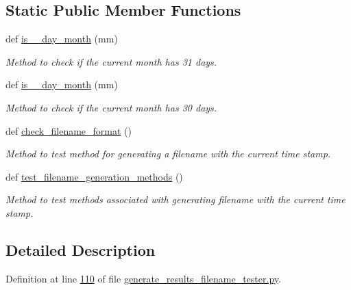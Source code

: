 \subsection*{Static Public Member Functions}
\begin{DoxyCompactItemize}
\item 
def \hyperlink{classutilities_1_1generate__results__filename__tester_1_1generate__filename__tester_a2f7f8ef1861b75a2b2a0ffe583bcdc81}{is\+\_\+\_\+day\+\_\+month} (mm)
\begin{DoxyCompactList}\small\item\em Method to check if the current month has 31 days. \end{DoxyCompactList}\item 
def \hyperlink{classutilities_1_1generate__results__filename__tester_1_1generate__filename__tester_a7aae79997134dc7250949e725d92aedf}{is\+\_\+\_\+day\+\_\+month} (mm)
\begin{DoxyCompactList}\small\item\em Method to check if the current month has 30 days. \end{DoxyCompactList}\item 
def \hyperlink{classutilities_1_1generate__results__filename__tester_1_1generate__filename__tester_a4b73142b6465894e81a1393e829abee2}{check\+\_\+filename\+\_\+format} ()
\begin{DoxyCompactList}\small\item\em Method to test method for generating a filename with the current time stamp. \end{DoxyCompactList}\item 
def \hyperlink{classutilities_1_1generate__results__filename__tester_1_1generate__filename__tester_ab0d53bb62c79065e884afa6a184d690e}{test\+\_\+filename\+\_\+generation\+\_\+methods} ()
\begin{DoxyCompactList}\small\item\em Method to test methods associated with generating filename with the current time stamp. \end{DoxyCompactList}\end{DoxyCompactItemize}


\subsection{Detailed Description}


Definition at line \hyperlink{generate__results__filename__tester_8py_source_l00110}{110} of file \hyperlink{generate__results__filename__tester_8py_source}{generate\+\_\+results\+\_\+filename\+\_\+tester.\+py}.



